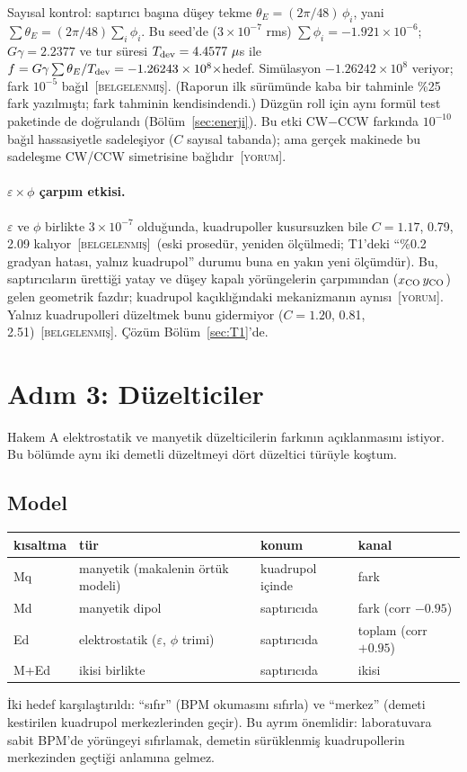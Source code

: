 \documentclass[11pt,a4paper]{article}
\newcommand{\BEL}{\textsc{[belgelenmiş]}}
\newcommand{\YOR}{\textsc{[yorum]}}
\begin{document}
Sayısal kontrol: saptırıcı başına düşey tekme $\theta_E=(2\pi/48)\,\phi_i$, yani
$\sum\theta_E=(2\pi/48)\sum_i\phi_i$. Bu seed'de ($3\times10^{-7}$ rms) $\sum\phi_i=-1.921\times10^{-6}$;
$G\gamma=2.2377$ ve tur süresi $T_{\rm dev}=4.4577~\mu$s ile $f=G\gamma\sum\theta_E/T_{\rm dev}
=-1.26243\times10^{8}\times$hedef. Simülasyon $-1.26242\times10^{8}$ veriyor; fark $10^{-5}$ bağıl~\BEL.
(Raporun ilk sürümünde kaba bir tahminle \%25 fark yazılmıştı; fark tahminin kendisindendi.) Düzgün roll
için aynı formül test paketinde de doğrulandı (Bölüm~\ref{sec:enerji}). Bu etki CW$-$CCW farkında
$10^{-10}$ bağıl hassasiyetle sadeleşiyor ($C$ sayısal tabanda); ama gerçek makinede bu sadeleşme CW/CCW
simetrisine bağlıdır~\YOR.

\paragraph{$\varepsilon\times\phi$ çarpım etkisi.} $\varepsilon$ ve $\phi$ birlikte $3\times10^{-7}$
olduğunda, kuadrupoller kusursuzken bile $C=1.17$, 0.79, 2.09 kalıyor~\BEL\ (eski prosedür, yeniden
ölçülmedi; T1'deki ``\%0.2 gradyan hatası, yalnız kuadrupol'' durumu buna en yakın yeni ölçümdür). Bu, saptırıcıların ürettiği
yatay ve düşey kapalı yörüngelerin çarpımından ($x_{\rm CO}\,y_{\rm CO}$) gelen geometrik fazdır;
kuadrupol kaçıklığındaki mekanizmanın aynısı~\YOR. Yalnız kuadrupolleri düzeltmek bunu gidermiyor
($C=1.20$, 0.81, 2.51)~\BEL. Çözüm Bölüm~\ref{sec:T1}'de.

\section{Adım 3: Düzelticiler}

Hakem A elektrostatik ve manyetik düzelticilerin farkının açıklanmasını istiyor. Bu bölümde aynı iki
demetli düzeltmeyi dört düzeltici türüyle koştum.

\subsection{Model}
\begin{center}\small
\begin{tabular}{llll}
\toprule
kısaltma & tür & konum & kanal \\
\midrule
Mq & manyetik (makalenin örtük modeli) & kuadrupol içinde & fark \\
Md & manyetik dipol & saptırıcıda & fark (corr $-0.95$) \\
Ed & elektrostatik ($\varepsilon$, $\phi$ trimi) & saptırıcıda & toplam (corr $+0.95$) \\
M+Ed & ikisi birlikte & saptırıcıda & ikisi \\
\bottomrule
\end{tabular}
\end{center}
İki hedef karşılaştırıldı: ``sıfır'' (BPM okumasını sıfırla) ve ``merkez'' (demeti kestirilen kuadrupol
merkezlerinden geçir). Bu ayrım önemlidir: laboratuvara sabit BPM'de yörüngeyi sıfırlamak, demetin
sürüklenmiş kuadrupollerin merkezinden geçtiği anlamına gelmez.
\end{document}
